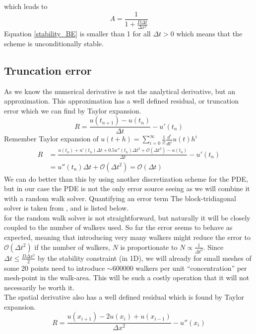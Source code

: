 which leads to 
\begin{equation}\label{stability_BE}
A = \frac{1}{ 1+\frac{D\Delta t}{\Delta x^2}}
\end{equation}
Equation \ref{stability_BE} is smaller than 1 for all $\Delta t>0$ which means that the scheme is unconditionally stable.

\subsection{Truncation error}\label{truncation_error}

As we know the numerical derivative is not the analytical derivative, but an approximation. 
This approximation has a well defined residual, or truncation error which we can find by Taylor expansion.
\begin{equation*}
  R = \frac{u(t_{n+1}) -u(t_n)}{\Delta t} -u'(t_n)
\end{equation*}
Remember Taylor expansion of $u(t+h) = \sum\limits_{i=0}^\infty\frac{1}{i!}\frac{d^i}{dt^i}u(t)h^i$
\begin{align*}
 R &= \frac{u(t_n)+u'(t_n)\Delta t +0.5u''(t_n)\Delta t^2 + \mathcal{O}(\Delta t^3)-u(t_n)}{\Delta t} -u'(t_n)\\
  &= u''(t_n)\Delta t+ \mathcal{O}(\Delta t^2) = \mathcal{O}(\Delta t)
\end{align*}
We can do better than this by using another discretization scheme for the PDE, but in our case the PDE is not the only error source seeing as we will combine it with a random walk solver. 
Quantifying an error term The block-tridiagonal solver is taken from \cite{}, and is listed below.\\for the random walk solver is not straightforward, but naturally it will be closely coupled to the number of walkers used. 
So far the error seems to behave as expected, meaning that introducing very many walkers might reduce the error to $\mathcal{O}(\Delta t^2)$ if the number of walkers, $N$ is proportionate to $N\propto\frac{1}{\Delta t^2}$. 
Since $\Delta t \leq\frac{D\Delta x^2}{2}$ by the stability constraint (in 1D), we will already for small meshes of some 20 points need to introduce $\sim600000$ walkers per unit ``concentration'' per mesh-point in the walk-area. 
This will be such a costly operation that it will not necessarily be worth it.\\
The spatial derivative also has a well defined residual which is found by Taylor expansion.
\begin{equation}
R = \frac{u(x_{i+1})-2u(x_i)+u(x_{i-1})}{\Delta x^2}-u''(x_i) 
\end{equation}
